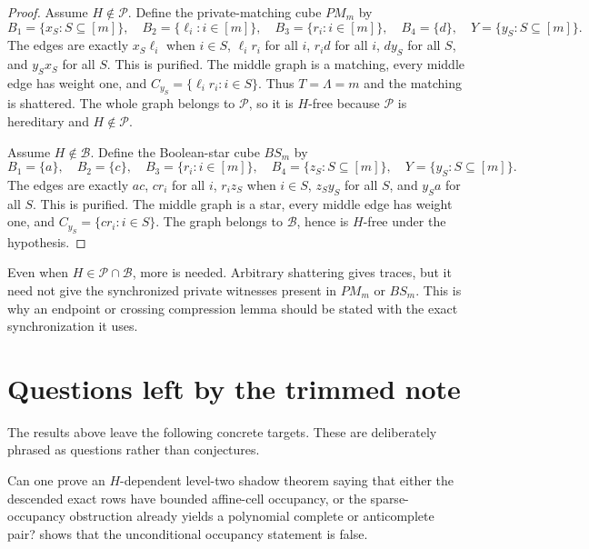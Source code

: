 \begin{proof}
Assume $H\notin\mathcal P$. Define the private-matching cube $PM_m$ by
\[
  B_1=\{x_S:S\subseteq[m]\},\quad B_2=\{\ell_i:i\in[m]\},\quad B_3=\{r_i:i\in[m]\},\quad B_4=\{d\},\quad Y=\{y_S:S\subseteq[m]\}.
\]
The edges are exactly $x_S\ell_i$ when $i\in S$, $\ell_i r_i$ for all $i$, $r_i d$ for all $i$, $dy_S$ for all $S$, and $y_Sx_S$ for all $S$. This is purified. The middle graph is a matching, every middle edge has weight one, and $C_{y_S}=\{\ell_i r_i:i\in S\}$. Thus $T=\Lambda=m$ and the matching is shattered. The whole graph belongs to $\mathcal P$, so it is $H$-free because $\mathcal P$ is hereditary and $H\notin\mathcal P$.

Assume $H\notin\mathcal B$. Define the Boolean-star cube $BS_m$ by
\[
  B_1=\{a\},\quad B_2=\{c\},\quad B_3=\{r_i:i\in[m]\},\quad B_4=\{z_S:S\subseteq[m]\},\quad Y=\{y_S:S\subseteq[m]\}.
\]
The edges are exactly $ac$, $cr_i$ for all $i$, $r_iz_S$ when $i\in S$, $z_Sy_S$ for all $S$, and $y_Sa$ for all $S$. This is purified. The middle graph is a star, every middle edge has weight one, and $C_{y_S}=\{cr_i:i\in S\}$. The graph belongs to $\mathcal B$, hence is $H$-free under the hypothesis.
\end{proof}

\begin{remark}
Even when $H\in\mathcal P\cap\mathcal B$, more is needed. Arbitrary shattering gives traces, but it need not give the synchronized private witnesses present in $PM_m$ or $BS_m$. This is why an endpoint or crossing compression lemma should be stated with the exact synchronization it uses.
\end{remark}

\section{Questions left by the trimmed note}

The results above leave the following concrete targets. These are deliberately phrased as questions rather than conjectures.

\begin{question}
Can one prove an $H$-dependent level-two shadow theorem saying that either the descended exact rows have bounded affine-cell occupancy, or the sparse-occupancy obstruction already yields a polynomial complete or anticomplete pair?  shows that the unconditional occupancy statement is false.
\end{question}

